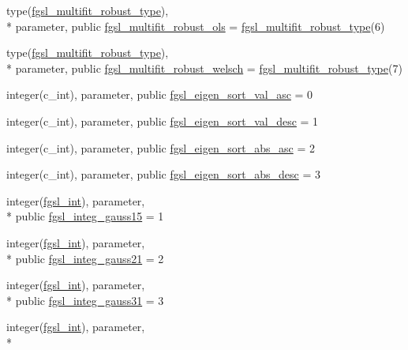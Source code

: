 \begin{DoxyCompactItemize}
\item 
type(\hyperlink{structfgsl_1_1fgsl__multifit__robust__type}{fgsl\-\_\-multifit\-\_\-robust\-\_\-type}), \\*
parameter, public \hyperlink{classfgsl_a21550651577589ca5adf0cdd17517848}{fgsl\-\_\-multifit\-\_\-robust\-\_\-ols} = \hyperlink{structfgsl_1_1fgsl__multifit__robust__type}{fgsl\-\_\-multifit\-\_\-robust\-\_\-type}(6)
\item 
type(\hyperlink{structfgsl_1_1fgsl__multifit__robust__type}{fgsl\-\_\-multifit\-\_\-robust\-\_\-type}), \\*
parameter, public \hyperlink{classfgsl_a5d48e88448a37e7bdc7af12abc799a83}{fgsl\-\_\-multifit\-\_\-robust\-\_\-welsch} = \hyperlink{structfgsl_1_1fgsl__multifit__robust__type}{fgsl\-\_\-multifit\-\_\-robust\-\_\-type}(7)
\item 
integer(c\-\_\-int), parameter, public \hyperlink{classfgsl_ad37ba047f5c1bbd5e2621f94d81a5aa4}{fgsl\-\_\-eigen\-\_\-sort\-\_\-val\-\_\-asc} = 0
\item 
integer(c\-\_\-int), parameter, public \hyperlink{classfgsl_a2dac34cd764be6e7de1f57d061c7f5d2}{fgsl\-\_\-eigen\-\_\-sort\-\_\-val\-\_\-desc} = 1
\item 
integer(c\-\_\-int), parameter, public \hyperlink{classfgsl_a5cf81e4e6e4b769e96ca69bea62e2d14}{fgsl\-\_\-eigen\-\_\-sort\-\_\-abs\-\_\-asc} = 2
\item 
integer(c\-\_\-int), parameter, public \hyperlink{classfgsl_a0ed0d4f25aa5ae03cb6adfe004cf648e}{fgsl\-\_\-eigen\-\_\-sort\-\_\-abs\-\_\-desc} = 3
\item 
integer(\hyperlink{classfgsl_a222deda1d7a0c0e845ce4a683318efeb}{fgsl\-\_\-int}), parameter, \\*
public \hyperlink{classfgsl_ae892609677dce6cab285f1a12f956f84}{fgsl\-\_\-integ\-\_\-gauss15} = 1
\item 
integer(\hyperlink{classfgsl_a222deda1d7a0c0e845ce4a683318efeb}{fgsl\-\_\-int}), parameter, \\*
public \hyperlink{classfgsl_a3c4e8f9478c6a8ab3bab6580929c8894}{fgsl\-\_\-integ\-\_\-gauss21} = 2
\item 
integer(\hyperlink{classfgsl_a222deda1d7a0c0e845ce4a683318efeb}{fgsl\-\_\-int}), parameter, \\*
public \hyperlink{classfgsl_a6fd868988f11aa3c2ab7c6a3d60ab1a0}{fgsl\-\_\-integ\-\_\-gauss31} = 3
\item 
integer(\hyperlink{classfgsl_a222deda1d7a0c0e845ce4a683318efeb}{fgsl\-\_\-int}), parameter, \\*

\end{DoxyCompactItemize}

